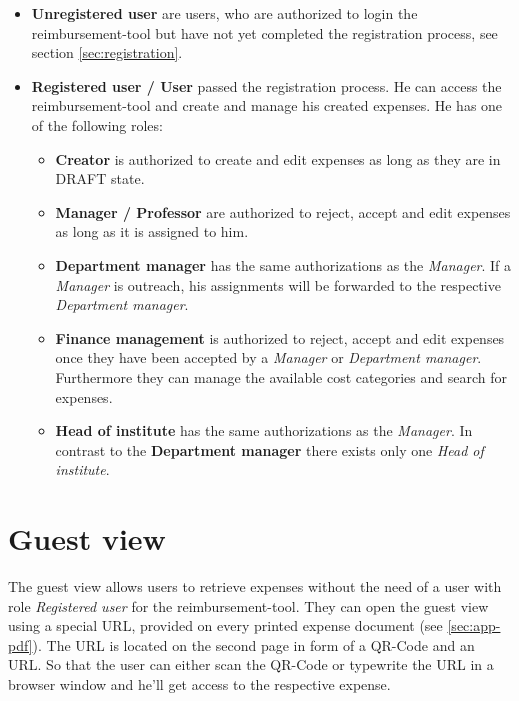 \begin{itemize}
    \item \textbf{Unregistered user} are users, who are authorized to login the reimbursement-tool but have not yet completed the registration process, see section \ref{sec:registration}.
    \item \textbf{Registered user / User} passed the registration process. He can access the reimbursement-tool and create and manage his created expenses. He has one of the following roles:
    
    \begin{itemize}
        \item \textbf{Creator} is authorized to create and edit expenses as long as they are in DRAFT state.
        
        \item \textbf{Manager / Professor} are authorized to reject, accept and edit expenses as long as it is assigned to him.
        
        \item \textbf{Department manager} has the same authorizations as the \textit{Manager}. If a \textit{Manager} is outreach, his assignments will be forwarded to the respective \textit{Department manager}.
        
        \item \textbf{Finance management} is authorized to reject, accept and edit expenses once they have been accepted by a \textit{Manager} or \textit{Department manager}. Furthermore they can manage the available cost categories and search for expenses.
        
        \item \textbf{Head of institute} has the same authorizations as the \textit{Manager}. In contrast to the \textbf{Department manager} there exists only one \textit{Head of institute}.
    \end{itemize}
\end{itemize}

\section{Guest view}
The guest view allows users to retrieve expenses without the need of a user with role \textit{Registered user} for the reimbursement-tool. They can open the guest view using a special URL, provided on every printed expense document (see \ref{sec:app-pdf}). The URL is located on the second page in form of a QR-Code and an URL. So that the user can either scan the QR-Code or typewrite the URL in a browser window and he'll get access to the respective expense.


